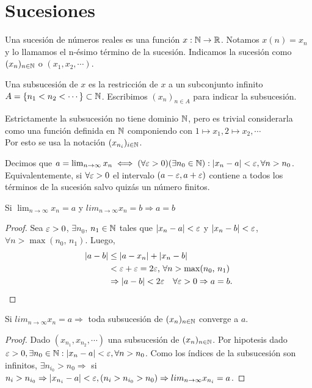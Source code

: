 \section{Sucesiones}

Una sucesión de números reales es una función \(x: \mathbb{N} \to \mathbb{R}\). Notamos \(x(n) = x_n\) y lo llamamos el n-ésimo término de la sucesión. Indicamos la sucesión como \((x_n)_{n \in \mathbb{N}}\) o \((x_1, x_2, \cdots)\).

Una subsucesión de \(x\) es la restricción de \(x\) a un subconjunto infinito \(A = \{ n_1 < n_2 < \cdots \} \subset \mathbb{N}\). Escribimos \((x_n)_{n \in A}\) para indicar la subsucesión.

\begin{note}
  Estrictamente la subsucesión no tiene dominio \(\mathbb{N}\), pero es trivial considerarla como una función definida en \(\mathbb{N}\) componiendo con \(1 \mapsto x_1, 2 \mapsto x_2, \cdots\) \\
  Por esto se usa la notación \((x_{n_i})_{i \in \mathbb{N}}\).
\end{note}

\begin{definition}
  Decimos que \(a = \lim_{n \to \infty} x_n \iff (\forall \varepsilon > 0)(\exists n_0 \in \mathbb{N}) : |x_n - a| < \varepsilon, \forall n > n_0\). \\
  Equivalentemente, si \(\forall \varepsilon > 0\) el intervalo \((a-\varepsilon, a+\varepsilon)\) contiene a todos los términos de la sucesión salvo quizás un número finitos.
\end{definition}

\begin{theorem}
  Si \(\lim_{n \to \infty} x_n = a\) y \(lim_{n \to \infty} x_n = b \Rightarrow a=b\)
  \begin{proof}
    Sea \(\varepsilon > 0\), \(\exists n_0\), \(n_1 \in \mathbb{N}\) tales que \(|x_n - a| < \varepsilon\) y \(|x_n - b| < \varepsilon\), \(\forall n > \max(n_0\text{, } n_1)\). Luego, \begin{align*}
      |a - b| & \leq |a - x_n| + |x_n - b|                                        \\
              & < \varepsilon + \varepsilon = 2\varepsilon\text{, } \forall n > \max(n_0\text{, } n_1)       \\
              & \Rightarrow |a - b| < 2\varepsilon \quad \forall \varepsilon > 0 \Rightarrow a = b.
    \end{align*}
  \end{proof}
\end{theorem}

\begin{theorem}
  Si \(lim_{n \to \infty} x_n = a \Rightarrow\) toda subsucesión de \((x_n)_{n \in \mathbb{N}}\) converge a \(a\).
  \begin{proof}
    Dado \((x_{n_1}, x_{n_2}, \cdots)\) una subsucesión de \((x_n)_{n \in \mathbb{N}}\). Por hipotesis dado \(\varepsilon > 0, \exists n_0 \in \mathbb{N} : |x_n - a| < \varepsilon, \forall n > n_0\). Como los índices de la subsucesión son infinitos, \(\exists n_{i_0} > n_0 \Rightarrow\) si \(n_i > n_{i_0} \Rightarrow |x_{n_i} - a| < \varepsilon, (n_i > n_{i_0} > n_0) \Rightarrow lim_{n \to \infty} x_{n_i} = a\).
  \end{proof}
\end{theorem}

